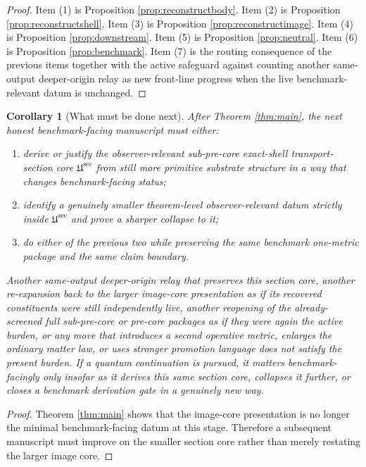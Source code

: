\documentclass[11pt]{article}
\newcommand{\SubPreSectionCore}{\mathfrak U^{\mathrm{sec}}}
\newtheorem{corollary}{Corollary}
\begin{document}
\begin{proof}
Item (1) is Proposition \ref{prop:reconstructbody}. Item (2) is Proposition \ref{prop:reconstructshell}. Item (3) is Proposition \ref{prop:reconstructimage}. Item (4) is Proposition \ref{prop:downstream}. Item (5) is Proposition \ref{prop:neutral}. Item (6) is Proposition \ref{prop:benchmark}. Item (7) is the routing consequence of the previous items together with the active safeguard against counting another same-output deeper-origin relay as new front-line progress when the live benchmark-relevant datum is unchanged.
\end{proof}

\begin{corollary}[What must be done next]
\label{cor:next}
After Theorem \ref{thm:main}, the next honest benchmark-facing manuscript must either:
\begin{enumerate}
    \item derive or justify the observer-relevant sub-pre-core exact-shell transport-section core \(\SubPreSectionCore\) from still more primitive substrate structure in a way that changes benchmark-facing status;
    \item identify a genuinely smaller theorem-level observer-relevant datum strictly inside \(\SubPreSectionCore\) and prove a sharper collapse to it;
    \item do either of the previous two while preserving the same benchmark one-metric package and the same claim boundary.
\end{enumerate}
Another same-output deeper-origin relay that preserves this section core, another re-expansion back to the larger image-core presentation as if its recovered constituents were still independently live, another reopening of the already-screened full sub-pre-core or pre-core packages as if they were again the active burden, or any move that introduces a second operative metric, enlarges the ordinary matter law, or uses stronger promotion language does not satisfy the present burden. If a quantum continuation is pursued, it matters benchmark-facingly only insofar as it derives this same section core, collapses it further, or closes a benchmark derivation gate in a genuinely new way.
\end{corollary}

\begin{proof}
Theorem \ref{thm:main} shows that the image-core presentation is no longer the minimal benchmark-facing datum at this stage. Therefore a subsequent manuscript must improve on the smaller section core rather than merely restating the larger image core.
\end{proof}
\end{document}
